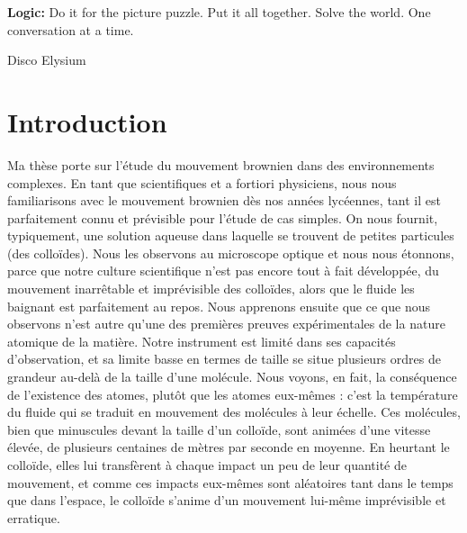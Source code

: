 
\epigraph{\textcolor{Cerulean}{\bf{Logic:}} Do it for the picture puzzle. Put it all together. Solve the world. One conversation at a time.}{Disco Elysium}

\section*{Introduction}
Ma thèse porte sur l'étude du mouvement brownien dans des environnements complexes. En tant que scientifiques et a fortiori physiciens, nous nous familiarisons avec le mouvement brownien dès nos années lycéennes, tant il est parfaitement connu et prévisible pour l'étude de cas simples. On nous fournit, typiquement, une solution aqueuse dans laquelle se trouvent de petites particules (des colloïdes). Nous les observons au microscope optique et nous nous étonnons, parce que notre culture scientifique n'est pas encore tout à fait développée, du mouvement inarrêtable et imprévisible des colloïdes, alors que le fluide les baignant est parfaitement au repos. Nous apprenons ensuite que ce que nous observons n'est autre qu'une des premières preuves expérimentales de la nature atomique de la matière. Notre instrument est limité dans ses capacités d'observation, et sa limite basse en termes de taille se situe plusieurs ordres de grandeur au-delà de la taille d'une molécule. Nous voyons, en fait, la conséquence de l'existence des atomes, plutôt que les atomes eux-mêmes : c'est la température du fluide qui se traduit en mouvement des molécules à leur échelle. Ces molécules, bien que minuscules devant la taille d'un colloïde, sont animées d'une vitesse élevée, de plusieurs centaines de mètres par seconde en moyenne. En heurtant le colloïde, elles lui transfèrent à chaque impact un peu de leur quantité de mouvement, et comme ces impacts eux-mêmes sont aléatoires tant dans le temps que dans l'espace, le colloïde s'anime d'un mouvement lui-même imprévisible et erratique.


